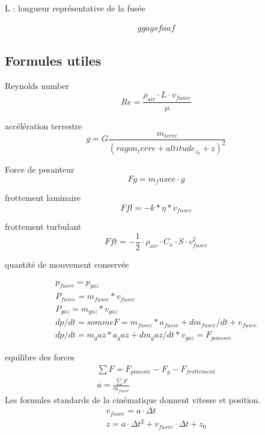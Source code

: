 \documentclass[12pt,a4paper]{article}
\begin{document}
\medbreak

\medbreak

\medbreak

\medbreak
L : longueur représentative de la fusée


\begin{eqnarray}
ggagsfaaf
\end{eqnarray}

\subsection{Formules utiles}
Reynolds number
\begin{equation}
	Re=\frac{\rho_{air} \cdot L \cdot v_{fusee}}{\mu}
\end{equation}


accélération terrestre
\begin{equation}
g= G \frac{m_{terre}}{(rayon_terre+altitude_{z_0}+z)^2}
\end{equation}

Force de pesanteur
\begin{equation}
Fg=m_fusee \cdot g
\end{equation}

frottement laminaire
\begin{equation}
Ffl=-k*\eta*v_{fusee}
\end{equation}

frottement turbulant
\begin{equation}
Fft=-\frac{1}{2} \cdot \rho_{air} \cdot C_x \cdot S \cdot v_{fusee}^2
\end{equation}

quantité de mouvement conservée

\begin{eqnarray}
	p_{fusee}=p_{gaz}\\
	P_{fusee}=m_{fusee}*v_{fusee}\\
	P_{gaz}=m_{gaz}*v_{gaz}\\
	dp/dt=somme F=m_{fusee}*a_{fusse}+ d m_{fusee}/dt+v_{fusee}\\
	dp/dt=m_gaz*a_gaz+d m_gaz/dt*v_{gaz}=F_{poussee}
\end{eqnarray}



equilibre des forces
\begin{eqnarray}
\sum F=F_{poussée}-F_g-F_{frottement}\\
a=\frac{\sum F}{m_{fusee}}
\end{eqnarray}
Les formules standards de la cinématique donnent vitesse et position. 
\begin{eqnarray}
v_{fusee}=a \cdot \Delta t\\
z=a \cdot \Delta t^2+v_{fusee} \cdot \Delta t+z_0
\end{eqnarray}
\end{document}
